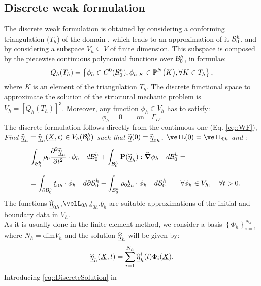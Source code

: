 \subsection{Discrete weak formulation}
\label{sct-DiscreteWF} The discrete weak formulation is obtained by
considering a conforming triangulation ($T_h$) of the domain \RefCon,
which leads to an approximation of it $\mathcal{B}_0^h$, and by considering
a subspace $V_h\subseteq V$ of finite dimension. This subspace is
composed by the piecewise continuous polynomial functions over
$\mathcal{B}_0^h$, in formulae:
\begin{equation} Q_h(T_h)=\left\{\phi_h \in C^0(\mathcal{B}_0^h),
\phi_{h|K} \in \mathbb{P}^N\big(K\big), \forall K \in T_h\right\},
  \label{eq::SpaceDiscrete}
\end{equation} where $K$ is an element of the triangulation $T_h$. The
discrete functional space to approximate the solution of the
structural mechanic problem is
$V_h=\left[Q_h(T_h)\right]^3$. Moreover, any function $\phi_h\in V_h$
has to satisfy:
\begin{displaymath} \phi_h=0 \qquad \text{on}\quad\Gamma_D.
\end{displaymath} The discrete formulation follows directly from the
continuous one (Eq. \eqref{eq::WF}),\\ \textit{Find
$\widehat{\underline{\eta}}_h=\widehat{\underline{\eta}}_h(\underline{X},t)\in V_h(\mathcal{B}_0^h)$ such that
$\widehat{\underline{\eta}}(0)=\widehat{\underline{\eta}}_{0h}$, $\velL(0)=\velL_{0h}$ and} :
\begin{equation}
  \begin{array}{lll} & \displaystyle
\int_{\mathcal{B}_0^h}\rho_0\frac{\partial^2 \widehat{\underline{\eta}}_h}{\partial
t^2}\cdot\phi_h\quad d\mathcal{B}_0^h +
\int_{\mathcal{B}_0^h}\textbf{P}(\widehat{\underline{\eta}}_h):\widehat{\boldsymbol{\nabla}}\phi_h\quad d\mathcal{B}_0^h = \\
\\ & \displaystyle = \int_{\partial
\mathcal{B}_0^h}\underline{t}_{0h}\cdot\phi_h\quad d\partial\mathcal{B}_0^h +
\int_{\mathcal{B}_0^h}\rho_0 \underline{b}_h\cdot\phi_h\quad d\mathcal{B}_0^h
\qquad \forall \phi_h\in V_h, \quad \forall t>0.
    \end{array}
  \label{eq::DWF}
\end{equation} The functions
$\widehat{\underline{\eta}}_{0h}$,$\velL_{0h}$,$\underline{t}_{0h}$,$\underline{b}_h$ are
suitable approximations of the initial and boundary data in $V_h$.\\
As it is usually done in the finite element method, we consider a
basis $\left\{\Phi_h\right\}_{i=1}^{N_h}$ where $N_h=\text{dim}V_h$
and the solution $\widehat{\underline{\eta}}_h$ will be given by:
\begin{equation} \displaystyle \widehat{\underline{\eta}}_h(\underline{X},t)=
\sum_{i=1}^{N_h}\widehat{\underline{\eta}}_h^i(t)\Phi_i(\underline{X}).
  \label{eq::DiscreteSolution}
\end{equation} Introducing \eqref{eq::DiscreteSolution} in

